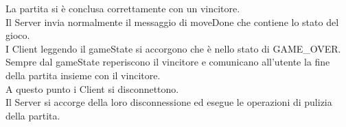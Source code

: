 \documentclass{article}
\begin{document}
La partita si è conclusa correttamente con un vincitore.\\
Il Server invia normalmente il messaggio di moveDone che contiene lo stato del gioco.\\
I Client leggendo il gameState si accorgono che è nello stato di GAME\_OVER. Sempre dal gameState reperiscono il vincitore e comunicano all'utente la fine della partita insieme con il vincitore.\\
A questo punto i Client si disconnettono.\\
Il Server si accorge della loro disconnessione ed esegue le operazioni di pulizia della partita.\\
\end{document}
